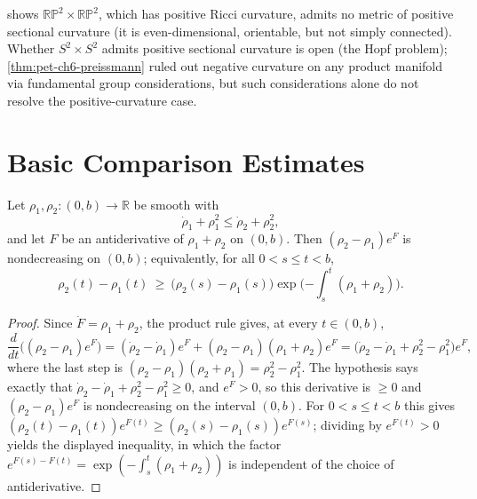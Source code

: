 \begin{remark}
  \label{rem:pet-ch6-hopf-problem}
   shows $\mathbb{RP}^2\times\mathbb{RP}^2$, which has
  positive Ricci curvature, admits no metric of positive sectional curvature
  (it is even-dimensional, orientable, but not simply connected). Whether
  $S^2\times S^2$ admits positive sectional curvature is open (the Hopf
  problem); \cref{thm:pet-ch6-preissmann} ruled out negative curvature on any
  product manifold via fundamental group considerations, but such
  considerations alone do not resolve the positive-curvature case.
\end{remark}

\section{Basic Comparison Estimates}

\begin{proposition}
  \label{prop:pet-ch6-riccati-comparison-principle}
  \leanok
  Let $\rho_1,\rho_2:(0,b)\to\mathbb{R}$ be smooth with
  \[
    \dot\rho_1+\rho_1^2\le\dot\rho_2+\rho_2^2 ,
  \]
  and let $F$ be an antiderivative of $\rho_1+\rho_2$ on $(0,b)$. Then
  $(\rho_2-\rho_1)e^{F}$ is nondecreasing on $(0,b)$; equivalently, for all
  $0<s\le t<b$,
  \[
    \rho_2(t)-\rho_1(t)\ \ge\ \big(\rho_2(s)-\rho_1(s)\big)
      \exp\Big({-\int_s^t(\rho_1+\rho_2)}\Big).
  \]
\end{proposition}
\begin{proof}
  \leanok
  Since $\dot F=\rho_1+\rho_2$, the product rule gives, at every $t\in(0,b)$,
  \[
    \frac{d}{dt}\big((\rho_2-\rho_1)e^{F}\big)
      =(\dot\rho_2-\dot\rho_1)e^{F}+(\rho_2-\rho_1)(\rho_1+\rho_2)e^{F}
      =\big(\dot\rho_2-\dot\rho_1+\rho_2^2-\rho_1^2\big)e^{F},
  \]
  where the last step is $(\rho_2-\rho_1)(\rho_2+\rho_1)=\rho_2^2-\rho_1^2$. The
  hypothesis says exactly that $\dot\rho_2-\dot\rho_1+\rho_2^2-\rho_1^2\ge0$, and
  $e^{F}>0$, so this derivative is $\ge0$ and $(\rho_2-\rho_1)e^{F}$ is
  nondecreasing on the interval $(0,b)$. For $0<s\le t<b$ this gives
  $(\rho_2(t)-\rho_1(t))e^{F(t)}\ge(\rho_2(s)-\rho_1(s))e^{F(s)}$; dividing by
  $e^{F(t)}>0$ yields the displayed inequality, in which the factor
  $e^{F(s)-F(t)}=\exp(-\int_s^t(\rho_1+\rho_2))$ is independent of the choice of
  antiderivative.
\end{proof}

